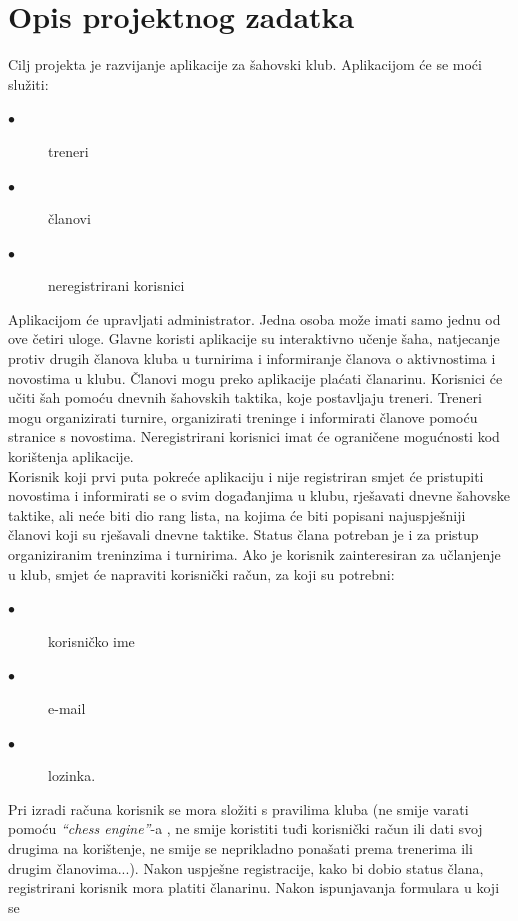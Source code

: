\chapter{Opis projektnog zadatka}
		
		 \noindent   Cilj projekta je razvijanje aplikacije za šahovski klub. Aplikacijom će
			se moći služiti:
			
			\begin{description}
				\item[$\bullet$] treneri 
				\item[$\bullet$] članovi
				\item[$\bullet$] neregistrirani korisnici
			\end{description} 
		    Aplikacijom će upravljati administrator. Jedna osoba može imati samo jednu od ove
			četiri uloge. Glavne koristi aplikacije su interaktivno učenje šaha,
			natjecanje protiv drugih članova kluba u turnirima i informiranje članova
			o aktivnostima i novostima u klubu. Članovi mogu preko aplikacije plaćati članarinu. Korisnici će učiti šah pomoću dnevnih šahovskih
			taktika, koje postavljaju treneri. Treneri mogu organizirati turnire,
			organizirati treninge i informirati članove pomoću stranice s novostima.
			Neregistrirani korisnici imat će ograničene mogućnosti kod korištenja
			aplikacije. \\
		    Korisnik koji prvi puta pokreće aplikaciju i nije registriran smjet će
			pristupiti novostima i informirati se o svim događanjima u klubu,
			rješavati dnevne šahovske taktike, ali neće biti dio rang lista, na
			kojima će biti popisani najuspješniji članovi koji su rješavali dnevne
			taktike. Status člana potreban je i za pristup organiziranim treninzima
			i turnirima. Ako je korisnik zainteresiran za učlanjenje u klub,
			smjet će napraviti korisnički račun, za koji su potrebni:
			\begin{description}
			\item[$\bullet$] korisničko ime
			\item[$\bullet$] e-mail
			\item[$\bullet$] lozinka. 
	    	\end{description} 
			Pri izradi računa korisnik se mora složiti s
			pravilima kluba (ne smije varati pomoću \textit{``chess engine''}-a , ne smije
			koristiti tuđi korisnički račun ili dati svoj drugima na korištenje, ne
			smije se neprikladno ponašati prema trenerima ili drugim članovima...).
			Nakon uspješne registracije, kako bi dobio status člana, registrirani
			korisnik mora platiti članarinu. Nakon ispunjavanja formulara u koji se
